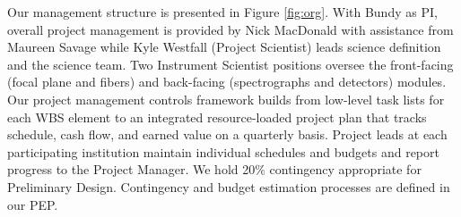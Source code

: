\documentclass[oneside,11pt]{amsart}
\begin{document}
Our management structure is presented in Figure \ref{fig:org}.  With Bundy as PI, overall project management is
provided by Nick MacDonald with assistance from Maureen Savage while Kyle Westfall (Project Scientist) leads science
definition and the science team.  Two Instrument Scientist positions oversee the front-facing (focal plane and fibers)
and back-facing (spectrographs and detectors) modules.  Our project management controls framework builds from low-level
task lists for each WBS element to an integrated resource-loaded project plan that tracks schedule, cash flow, and
earned value on a quarterly basis.  Project leads at each participating institution maintain individual schedules and
budgets and report progress to the Project Manager.  We hold 20\% contingency appropriate for Preliminary Design.
Contingency and budget estimation processes are defined in our PEP.





\newpage

\setcounter{page}{1}


\end{document}
